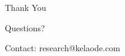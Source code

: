 \documentclass{beamer}
\begin{document}
\begin{frame}{Thank You}
    \begin{center}
        \Huge{Questions?}
        
        \vspace{1cm}
        \normalsize{Contact: research@kelaode.com}
    \end{center}
\end{frame}
\end{document}
